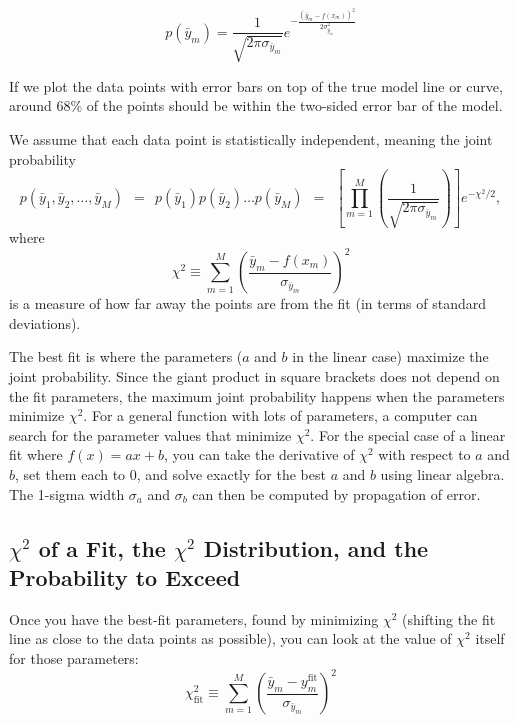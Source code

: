 \documentclass[12pt]{article}
\newcommand{\eq}[1]{ \stackrel{\scriptscriptstyle #1}{=}} %
\begin{document}
\[
p(\bar y_m) = \frac{1}{\sqrt{2 \pi \sigma_{\bar y_m}}} e^{-\frac{(\bar y_m-f(x_m))^2}{2\sigma_{\bar y_m}^2}}
\]


\noindent If we plot the data points with error bars on top of the true model line or curve, around 68\% of the points should be within the two-sided error bar of the model.

\noindent We assume that each data point is statistically independent, meaning the joint probability
\[
p(\bar y_1, \bar y_2, \dots, \bar y_M)
\ \  = \ \ 
p(\bar y_1) p(\bar y_2) \dots p(\bar y_M)
\ \  = \ \ 
\left[\prod_{m=1}^M\left(  \frac{1}{\sqrt{2 \pi \sigma_{\bar y_m}}} \right) \right]
e^{-\chi^2/2} ,
\]
where
\[
\chi^2 \equiv 
\sum_{m=1}^{M} \left( \frac{\bar y_m - f(x_m)}{\sigma_{\bar y_m}} \right)^2
\]
is a measure of how far away the points are from the fit (in terms of standard deviations).

The best fit is where the parameters ($a$ and $b$ in the linear case) maximize the joint probability. Since the giant product in square brackets does not depend on the fit parameters, the maximum joint probability happens when the parameters minimize $\chi^2$. For a general function with lots of parameters, a computer can search for the parameter values that minimize $\chi^2$. For the special case of a linear fit where $f(x)=ax+b$, you can take the derivative of $\chi^2$ with respect to $a$ and $b$, set them each to 0, and solve exactly for the best $a$ and $b$ using linear algebra. The 1-sigma width $\sigma_a$ and $\sigma_b$ can then be computed by propagation of error.

\pagebreak

\subsection*{$\chi^2$ of a Fit, the $\chi^2$ Distribution, and the Probability to Exceed}

Once you have the best-fit parameters, found by minimizing $\chi^2$ (shifting the fit line as close to the data points as possible), you can look at the value of $\chi^2$ itself for those parameters:
\[
\chi_\textrm{fit}^2 \equiv 
\sum_{m=1}^{M} \left( \frac{\bar y_m - y^\textrm{fit}_m}{\sigma_{\bar y_m}} \right)^2
\]
\end{document}
